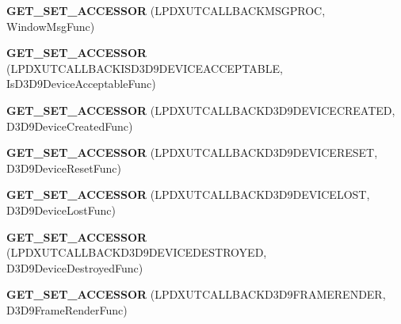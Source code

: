 \begin{DoxyCompactItemize}
\item 
\hypertarget{class_d_x_u_t_state_ad1bb362f5ba107db996d96cd39bd8245}{{\bfseries G\+E\+T\+\_\+\+S\+E\+T\+\_\+\+A\+C\+C\+E\+S\+S\+O\+R} (L\+P\+D\+X\+U\+T\+C\+A\+L\+L\+B\+A\+C\+K\+M\+S\+G\+P\+R\+O\+C, Window\+Msg\+Func)}\label{class_d_x_u_t_state_ad1bb362f5ba107db996d96cd39bd8245}

\item 
\hypertarget{class_d_x_u_t_state_a98ddcc53c9af6c8da6699eba31882c81}{{\bfseries G\+E\+T\+\_\+\+S\+E\+T\+\_\+\+A\+C\+C\+E\+S\+S\+O\+R} (L\+P\+D\+X\+U\+T\+C\+A\+L\+L\+B\+A\+C\+K\+I\+S\+D3\+D9\+D\+E\+V\+I\+C\+E\+A\+C\+C\+E\+P\+T\+A\+B\+L\+E, Is\+D3\+D9\+Device\+Acceptable\+Func)}\label{class_d_x_u_t_state_a98ddcc53c9af6c8da6699eba31882c81}

\item 
\hypertarget{class_d_x_u_t_state_a26a46c996276b11b07713032690807b7}{{\bfseries G\+E\+T\+\_\+\+S\+E\+T\+\_\+\+A\+C\+C\+E\+S\+S\+O\+R} (L\+P\+D\+X\+U\+T\+C\+A\+L\+L\+B\+A\+C\+K\+D3\+D9\+D\+E\+V\+I\+C\+E\+C\+R\+E\+A\+T\+E\+D, D3\+D9\+Device\+Created\+Func)}\label{class_d_x_u_t_state_a26a46c996276b11b07713032690807b7}

\item 
\hypertarget{class_d_x_u_t_state_ad37ad5179f82d31bf03f15b299c78448}{{\bfseries G\+E\+T\+\_\+\+S\+E\+T\+\_\+\+A\+C\+C\+E\+S\+S\+O\+R} (L\+P\+D\+X\+U\+T\+C\+A\+L\+L\+B\+A\+C\+K\+D3\+D9\+D\+E\+V\+I\+C\+E\+R\+E\+S\+E\+T, D3\+D9\+Device\+Reset\+Func)}\label{class_d_x_u_t_state_ad37ad5179f82d31bf03f15b299c78448}

\item 
\hypertarget{class_d_x_u_t_state_aad413a2b6fb4525846ac47ccc84adeb6}{{\bfseries G\+E\+T\+\_\+\+S\+E\+T\+\_\+\+A\+C\+C\+E\+S\+S\+O\+R} (L\+P\+D\+X\+U\+T\+C\+A\+L\+L\+B\+A\+C\+K\+D3\+D9\+D\+E\+V\+I\+C\+E\+L\+O\+S\+T, D3\+D9\+Device\+Lost\+Func)}\label{class_d_x_u_t_state_aad413a2b6fb4525846ac47ccc84adeb6}

\item 
\hypertarget{class_d_x_u_t_state_abaf8c4053b083886903054cdf9bf73fb}{{\bfseries G\+E\+T\+\_\+\+S\+E\+T\+\_\+\+A\+C\+C\+E\+S\+S\+O\+R} (L\+P\+D\+X\+U\+T\+C\+A\+L\+L\+B\+A\+C\+K\+D3\+D9\+D\+E\+V\+I\+C\+E\+D\+E\+S\+T\+R\+O\+Y\+E\+D, D3\+D9\+Device\+Destroyed\+Func)}\label{class_d_x_u_t_state_abaf8c4053b083886903054cdf9bf73fb}

\item 
\hypertarget{class_d_x_u_t_state_a8084ad313618fb2200aab7781a8769e5}{{\bfseries G\+E\+T\+\_\+\+S\+E\+T\+\_\+\+A\+C\+C\+E\+S\+S\+O\+R} (L\+P\+D\+X\+U\+T\+C\+A\+L\+L\+B\+A\+C\+K\+D3\+D9\+F\+R\+A\+M\+E\+R\+E\+N\+D\+E\+R, D3\+D9\+Frame\+Render\+Func)}\label{class_d_x_u_t_state_a8084ad313618fb2200aab7781a8769e5}


\end{DoxyCompactItemize}
